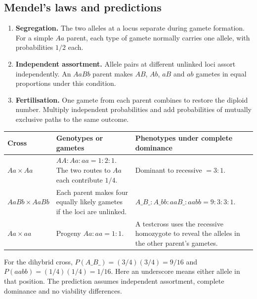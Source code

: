 \documentclass[12pt,a4paper]{article}
\begin{document}
\subsection{Mendel's laws and predictions}
\begin{enumerate}[leftmargin=*, itemsep=3pt, topsep=4pt]
  \item \textbf{Segregation.} The two alleles at a locus separate during gamete formation. For a simple $Aa$ parent, each type of gamete normally carries one allele, with probabilities $1/2$ each.
  \item \textbf{Independent assortment.} Allele pairs at different unlinked loci assort independently. An $AaBb$ parent makes $AB$, $Ab$, $aB$ and $ab$ gametes in equal proportions under this condition.
  \item \textbf{Fertilisation.} One gamete from each parent combines to restore the diploid number. Multiply independent probabilities and add probabilities of mutually exclusive paths to the same outcome.
\end{enumerate}
\begin{tcolorbox}[examplebox, title={Monohybrid and dihybrid crosses}]
\par\vspace{5pt}
\begingroup
\setlength{\extrarowheight}{1pt}
\noindent\begin{tabularx}{\linewidth}{|B{3.5cm}|Y|Y|}
\hline
\textbf{Cross} & \textbf{Genotypes or gametes} & \textbf{Phenotypes under complete dominance} \\ \hline
$Aa\times Aa$ & $AA:Aa:aa=1:2:1$. The two routes to $Aa$ each contribute $1/4$. & Dominant to recessive $=3:1$. \\ \hline
$AaBb\times AaBb$ & Each parent makes four equally likely gametes if the loci are unlinked. & $A\_B\_:A\_bb:aaB\_:aabb=9:3:3:1$. \\ \hline
$Aa\times aa$ & Progeny $Aa:aa=1:1$. & A testcross uses the recessive homozygote to reveal the alleles in the other parent's gametes. \\ \hline
\end{tabularx}\par
\endgroup
For the dihybrid cross, $P(A\_B\_)=(3/4)(3/4)=9/16$ and $P(aabb)=(1/4)(1/4)=1/16$. Here an underscore means either allele in that position. The prediction assumes independent assortment, complete dominance and no viability differences.
\end{tcolorbox}
\end{document}
